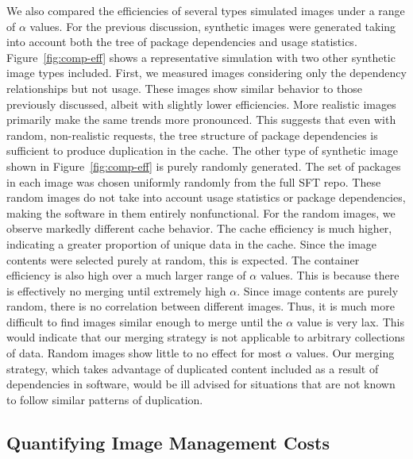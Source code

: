 \documentclass[sigconf]{acmart}
\begin{document}
We also compared the efficiencies of several types simulated images under a range of $\alpha$ values.
For the previous discussion, synthetic images were generated taking into account both the tree of package dependencies and usage statistics.
Figure~\ref{fig:comp-eff} shows a representative simulation with two other synthetic image types included.
First, we measured images considering only the dependency relationships but not usage.
These images show similar behavior to those previously discussed,
albeit with slightly lower efficiencies.
More realistic images primarily make the same trends more pronounced.
This suggests that even with random, non-realistic requests,
the tree structure of package dependencies is sufficient to produce duplication in the cache.
The other type of synthetic image shown in Figure~\ref{fig:comp-eff} is purely randomly generated.
The set of packages in each image was chosen uniformly randomly from the full SFT repo.
These random images do not take into account usage statistics or package dependencies,
making the software in them entirely nonfunctional.
For the random images,
we observe markedly different cache behavior.
The cache efficiency is much higher,
indicating a greater proportion of unique data in the cache.
Since the image contents were selected purely at random,
this is expected.
The container efficiency is also high over a much larger range of $\alpha$ values.
This is because there is effectively no merging until extremely high $\alpha$.
Since image contents are purely random,
there is no correlation between different images.
Thus, it is much more difficult to find images similar enough to merge until the $\alpha$ value is very lax.
This would indicate that our merging strategy is not applicable to arbitrary collections of data.
Random images show little to no effect for most $\alpha$ values.
Our merging strategy, which takes advantage of duplicated content included as a result of dependencies in software,
would be ill advised for situations that are not known to follow similar patterns of duplication.

\subsection{Quantifying Image Management Costs}
\end{document}
